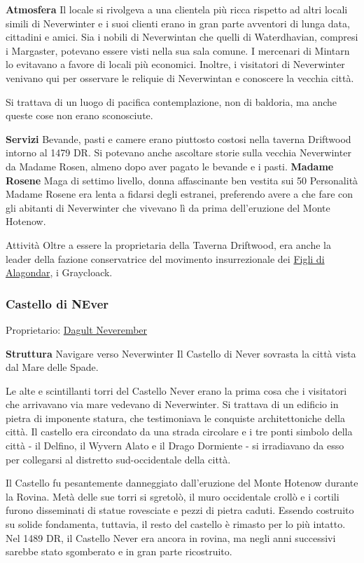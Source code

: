 \documentclass{article}
\begin{document}
\textbf{Atmosfera}
Il locale si rivolgeva a una clientela più ricca rispetto ad altri locali simili di Neverwinter e i suoi clienti erano in gran parte avventori di lunga data, cittadini e amici. Sia i nobili di Neverwintan che quelli di Waterdhavian, compresi i Margaster, potevano essere visti nella sua sala comune. I mercenari di Mintarn lo evitavano a favore di locali più economici. Inoltre, i visitatori di Neverwinter venivano qui per osservare le reliquie di Neverwintan e conoscere la vecchia città.

Si trattava di un luogo di pacifica contemplazione, non di baldoria, ma anche queste cose non erano sconosciute.

\textbf{Servizi}
Bevande, pasti e camere erano piuttosto costosi nella taverna Driftwood intorno al 1479 DR. Si potevano anche ascoltare storie sulla vecchia Neverwinter da Madame Rosen, almeno dopo aver pagato le bevande e i pasti.\newline
\textbf{Madame Rosene} Maga di settimo livello, donna affascinante ben vestita sui 50
Personalità
Madame Rosene era lenta a fidarsi degli estranei, preferendo avere a che fare con gli abitanti di Neverwinter che vivevano lì da prima dell'eruzione del Monte Hotenow.

Attività
Oltre a essere la proprietaria della Taverna Driftwood, era anche la leader della fazione conservatrice del movimento insurrezionale dei \hyperlink{alagondar}{Figli di Alagondar}, i Graycloack.

\subsubsection{Castello di NEver}
Proprietario: \hyperlink{https://forgottenrealms.fandom.com/wiki/Dagult_Neverember}{Dagult Neverember}

\textbf{Struttura}
Navigare verso Neverwinter
Il Castello di Never sovrasta la città vista dal Mare delle Spade.

Le alte e scintillanti torri del Castello Never erano la prima cosa che i visitatori che arrivavano via mare vedevano di Neverwinter. Si trattava di un edificio in pietra di imponente statura, che testimoniava le conquiste architettoniche della città. Il castello era circondato da una strada circolare e i tre ponti simbolo della città - il Delfino, il Wyvern Alato e il Drago Dormiente - si irradiavano da esso per collegarsi al distretto sud-occidentale della città.

Il Castello fu pesantemente danneggiato dall'eruzione del Monte Hotenow durante la Rovina. Metà delle sue torri si sgretolò, il muro occidentale crollò e i cortili furono disseminati di statue rovesciate e pezzi di pietra caduti. Essendo costruito su solide fondamenta, tuttavia, il resto del castello è rimasto per lo più intatto. Nel 1489 DR, il Castello Never era ancora in rovina, ma negli anni successivi sarebbe stato sgomberato e in gran parte ricostruito.
\end{document}
